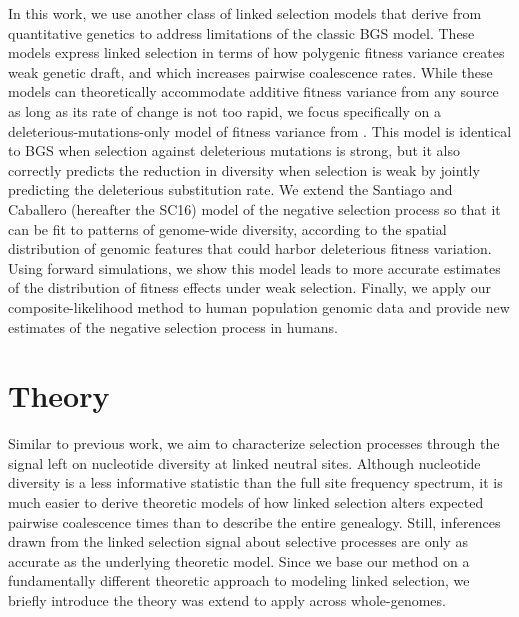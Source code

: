 \documentclass[11pt]{article}
\begin{document}
In this work, we use another class of linked selection models that derive from
quantitative genetics to address limitations of the classic BGS model. These
models express linked selection in terms of how polygenic fitness variance
creates weak genetic draft, and which increases pairwise coalescence rates.
While these models can theoretically accommodate additive fitness variance from
any source as long as its rate of change is not too rapid, we focus
specifically on a deleterious-mutations-only model of fitness variance from
\textcite{Santiago2016-mu}. This model is identical to BGS when selection
against deleterious mutations is strong, but it also correctly predicts the
reduction in diversity when selection is weak by jointly predicting the
deleterious substitution rate. We extend the Santiago and Caballero (hereafter
the SC16) model of the negative selection process so that it can be fit to
patterns of genome-wide diversity, according to the spatial distribution of
genomic features that could harbor deleterious fitness variation. Using forward
simulations, we show this model leads to more accurate estimates of the
distribution of fitness effects under weak selection. Finally, we apply our
composite-likelihood method to human population genomic data and provide new
estimates of the negative selection process in humans.

\section*{Theory}

Similar to previous work, we aim to characterize selection processes through
the signal left on nucleotide diversity at linked neutral sites. Although
nucleotide diversity is a less informative statistic than the full site
frequency spectrum, it is much easier to derive theoretic models of how linked
selection alters expected pairwise coalescence times than to describe the
entire genealogy. Still, inferences drawn from the linked selection signal
about selective processes are only as accurate as the underlying theoretic
model. Since we base our method on a fundamentally different theoretic approach
to modeling linked selection, we briefly introduce the theory was extend to
apply across whole-genomes.
\end{document}
